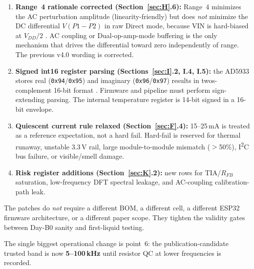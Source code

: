 \documentclass[11pt,a4paper]{article}
\begin{document}
\begin{tcolorbox}
\begin{enumerate}[topsep=2pt,itemsep=1pt,leftmargin=1.4em]
\item \textbf{Range~4 rationale corrected (Section~\ref{sec:H}.6):} Range~4 minimizes the AC perturbation amplitude (linearity-friendly) but does \emph{not} minimize the DC differential $V(P1\!-\!P2)$ in raw Direct mode, because VIN is hard-biased at $V_{DD}/2$ \cite{ad5933ds}. AC coupling or Dual-op-amp-mode buffering is the only mechanism that drives the differential toward zero independently of range. The previous v4.0 wording is corrected.
\item \textbf{Signed int16 register parsing (Sections~\ref{sec:I}.2, I.4, I.5):} the AD5933 stores real (\texttt{0x94}/\texttt{0x95}) and imaginary (\texttt{0x96}/\texttt{0x97}) results in twos-complement 16-bit format \cite{ad5933ds}. Firmware and pipeline must perform sign-extending parsing. The internal temperature register is 14-bit signed in a 16-bit envelope.
\item \textbf{Quiescent current rule relaxed (Section~\ref{sec:F}.4):} 15--25\,mA is treated as a reference expectation, not a hard fail. Hard-fail is reserved for thermal runaway, unstable 3.3\,V rail, large module-to-module mismatch ($>$50\%), I\textsuperscript{2}C bus failure, or visible/smell damage.
\item \textbf{Risk register additions (Section~\ref{sec:K}.2):} new rows for TIA/$R_{FB}$ saturation, low-frequency DFT spectral leakage, and AC-coupling calibration-path leak.
\end{enumerate}

The patches do \emph{not} require a different BOM, a different cell, a different ESP32 firmware architecture, or a different paper scope. They tighten the validity gates between Day-B0 sanity and first-liquid testing.

The single biggest operational change is point~6: the publication-candidate trusted band is now \textbf{5--100\,kHz} until resistor QC at lower frequencies is recorded.
\end{tcolorbox}

\vspace{2mm}
\end{document}
